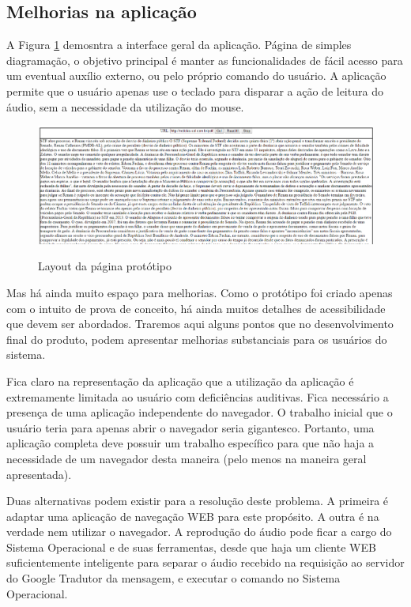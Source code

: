 \documentclass[
	12pt,				%
	oneside,			%
	a4paper,			%
	english,			%
	brazil				%
	]{abntex2ppgsi}
\begin{document}
\subsection{Melhorias na aplicação}

A Figura \ref{fig:figura-interface} demosntra a interface geral da aplicação. Página de simples diagramação, o objetivo principal é manter as funcionalidades de fácil acesso para um eventual auxílio externo, ou pelo próprio comando do usuário. A aplicação permite que o usuário apenas use o teclado para disparar a ação de leitura do áudio, sem a necessidade da utilização do mouse.

\begin{figure}[htbp]
	\centering
	\caption{Layout da página protótipo}
	\includegraphics[scale=0.4]{figura-interface.png}
	\label{fig:figura-interface}
	
\end{figure}

Mas há ainda muito espaço para melhorias. Como o protótipo foi criado apenas com o intuito de prova de conceito, há ainda muitos detalhes de acessibilidade que devem ser abordados. Traremos aqui alguns pontos que no desenvolvimento final do produto, podem apresentar melhorias substanciais para os usuários do sistema.

Fica claro na representação da aplicação que a utilização da aplicação é extremamente limitada ao usuário com deficiências auditivas. Fica necessário a presença de uma aplicação independente do navegador. O trabalho inicial que o usuário teria para apenas abrir o navegador seria gigantesco. Portanto, uma aplicação completa deve possuir um trabalho específico para que não haja a necessidade de um navegador desta maneira (pelo menos na maneira geral apresentada). 

Duas alternativas podem existir para a resolução deste problema. A primeira é adaptar uma aplicação de navegação WEB para este propósito. A outra é na verdade nem utilizar o navegador. A reprodução do áudio pode ficar a cargo do Sistema Operacional e de suas ferramentas, desde que haja um cliente WEB suficientemente inteligente para separar o áudio recebido na requisição ao servidor do Google Tradutor da mensagem, e executar o comando no Sistema Operacional.
\end{document}
